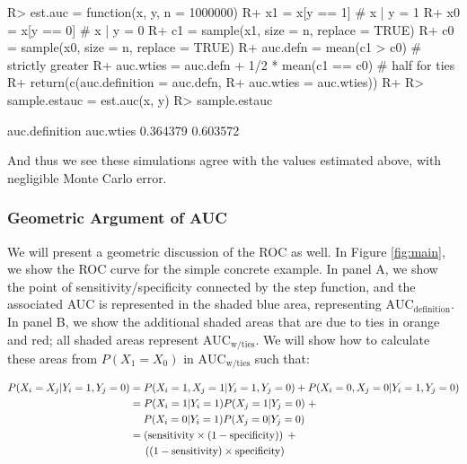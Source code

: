 \documentclass[12pt]{article}
\newenvironment{CodeChunk}{}{}
\begin{document}
\begin{CodeChunk}

\begin{CodeInput}
R> est.auc = function(x, y, n = 1000000) {
R+   x1 = x[y == 1] # x | y = 1
R+   x0 = x[y == 0] # x | y = 0
R+   c1 = sample(x1, size = n, replace = TRUE)
R+   c0 = sample(x0, size = n, replace = TRUE)
R+   auc.defn = mean(c1 > c0) # strictly greater
R+   auc.wties = auc.defn + 1/2 * mean(c1 == c0) # half for ties
R+   return(c(auc.definition = auc.defn,
R+            auc.wties = auc.wties))
R+ }
R> sample.estauc = est.auc(x, y)
R> sample.estauc
\end{CodeInput}

\begin{CodeOutput}
auc.definition      auc.wties 
      0.364379       0.603572 
\end{CodeOutput}
\end{CodeChunk}

And thus we see these simulations agree with the values estimated above,
with negligible Monte Carlo error.

\hypertarget{geometric-argument-of-auc}{%
\subsubsection{Geometric Argument of
AUC}\label{geometric-argument-of-auc}}

We will present a geometric discussion of the ROC as well. In Figure
\ref{fig:main}, we show the ROC curve for the simple concrete example.
In panel A, we show the point of sensitivity/specificity connected by
the step function, and the associated AUC is represented in the shaded
blue area, representing \(\text{AUC}_{\text{definition}}\). In panel B,
we show the additional shaded areas that are due to ties in orange and
red; all shaded areas represent \(\text{AUC}_{\text{w/ties}}\). We will
show how to calculate these areas from \(P(X_{1} = X_{0})\) in
\(\text{AUC}_{\text{w/ties}}\) such that:

\begin{align*}
P(X_{i} = X_{j} | Y_{i} = 1, Y_{j} = 0) &= P(X_{i} = 1, X_{j} = 1 | Y_{i} = 1, Y_{j} = 0) + P(X_{i} = 0, X_{j} = 0 | Y_{i} = 1, Y_{j} = 0) \\
&= P(X_{i} = 1 | Y_{i} = 1) P(X_{j} = 1 | Y_{j} = 0) \;+ \\
&\hspace{1.3em} P(X_{i} = 0 | Y_{i} = 1) P(X_{j} = 0 | Y_{j} = 0) \\
&= \left(\text{sensitivity} \times (1 - \text{specificity})\right) \;+ \\
&\hspace{1.3em} \left((1- \text{sensitivity}) \times \text{specificity}\right)
\end{align*}
\end{document}
